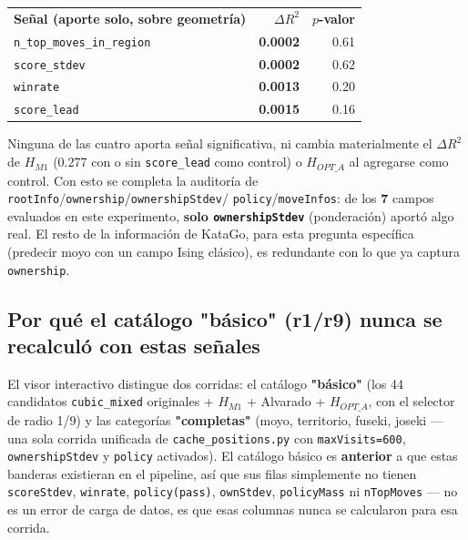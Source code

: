 \documentclass[11pt, a4paper]{article}
\newcommand{\TH}[1]{\cellcolor{cTHbg}\color{white}\textbf{#1}}
\newcommand{\bad}[1]{\color{cBad}\textbf{#1}}
\begin{document}
\medskip
\begin{center}
\begin{tabular}{lrr}
  \TH{Se\~nal (aporte solo, sobre geometr\'ia)} & \TH{$\Delta R^2$} & \TH{$p$-valor} \\[1pt]
  \texttt{n\_top\_moves\_in\_region} & \bad{0.0002} & 0.61 \\
  \texttt{score\_stdev}              & \bad{0.0002} & 0.62 \\
  \texttt{winrate}                   & \bad{0.0013} & 0.20 \\
  \texttt{score\_lead}               & \bad{0.0015} & 0.16 \\
\end{tabular}
\end{center}
\medskip

\begin{tcolorbox}[quotebox]
  Ninguna de las cuatro aporta se\~nal significativa, ni cambia
  materialmente el $\Delta R^2$ de $H_{M1}$ (0.277 con o sin
  \texttt{score\_lead} como control) o $H_{OPT\_A}$ al agregarse como
  control. Con esto se completa la auditor\'ia de
  \texttt{rootInfo}/\texttt{ownership}/\texttt{ownershipStdev}/%
  \texttt{policy}/\texttt{moveInfos}: de los \textbf{7} campos
  evaluados en este experimento, \textbf{solo \texttt{ownershipStdev}}
  (ponderaci\'on) aport\'o algo real. El resto de la informaci\'on de
  KataGo, para esta pregunta espec\'ifica (predecir moyo con un campo
  Ising cl\'asico), es redundante con lo que ya captura
  \texttt{ownership}.
\end{tcolorbox}

\subsection{Por qu\'e el cat\'alogo "b\'asico" (r1/r9) nunca se recalcul\'o con estas se\~nales}
\label{sec:por-que-no-basico}

El visor interactivo distingue dos corridas: el cat\'alogo
\textbf{"b\'asico"} (los 44 candidatos \texttt{cubic\_mixed} originales
+ $H_{M1}$ + Alvarado + $H_{OPT\_A}$, con el selector de radio 1/9) y
las categor\'ias \textbf{"completas"} (moyo, territorio, fuseki,
joseki --- una sola corrida unificada de \texttt{cache\_positions.py}
con \texttt{maxVisits=600}, \texttt{ownershipStdev} y \texttt{policy}
activados). El cat\'alogo b\'asico es \textbf{anterior} a que estas
banderas existieran en el pipeline, as\'i que sus filas simplemente no
tienen \texttt{scoreStdev}, \texttt{winrate}, \texttt{policy(pass)},
\texttt{ownStdev}, \texttt{policyMass} ni \texttt{nTopMoves} --- no es
un error de carga de datos, es que esas columnas nunca se calcularon
para esa corrida.
\end{document}
